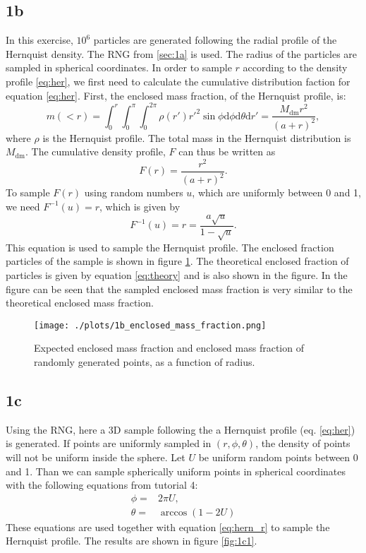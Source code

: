 \subsection*{1b}
In this exercise, $10^6$ particles are generated following the radial profile of the Hernquist density. The RNG from \ref{sec:1a} is used. The radius of the particles are sampled in spherical coordinates. In order to sample $r$ according to the density profile \ref{eq:her}, we first need to calculate the cumulative distribution faction for equation \ref{eq:her}. First, the enclosed mass fraction, of the Hernquist profile, is:
\begin{equation}
  m(<r) = \int_0^r \int_0^\pi \int_0^{2\pi} \rho(r') r'^2 \sin\phi \mathrm{d}\phi\mathrm{d}\theta\mathrm{d}r'=\frac{M_\mathrm{dm}r^2}{\left(a+r\right)^2},
\end{equation}
where $\rho$ is the Hernquist profile. The total mass in the Hernquist distribution is $M_\mathrm{dm}$. The cumulative density profile, $F$ can thus be written as
\begin{equation}\label{eq:theory}
  F(r) = \frac{r^2}{\left(a+r\right)^2}.
\end{equation}
To sample $F(r)$ using random numbers $u$, which are uniformly between 0 and 1, we need $F^{-1}(u) = r$, which is given by
\begin{equation}\label{eq:hern_r}
  F^{-1}(u) = r = \frac{a\sqrt{u}}{1-\sqrt{u}}.
\end{equation}
This equation is used to sample the Hernquist profile. The enclosed fraction particles of the sample is shown in figure \ref{fig:1b}. The theoretical enclosed fraction of particles is given by equation \ref{eq:theory} and is also shown in the figure. In the figure can be seen that the sampled enclosed mass fraction is very similar to the theoretical enclosed mass fraction.

\begin{figure}[!ht]
  \centering
  \texttt{[image: ./plots/1b\_enclosed\_mass\_fraction.png]}
  \caption{Expected enclosed mass fraction and enclosed mass fraction of randomly generated points, as a function of radius.}
  \label{fig:1b}
\end{figure}

\subsection*{1c}
Using the RNG, here a 3D sample following the a Hernquist profile (eq. \ref{eq:her}) is generated. If points are uniformly sampled in $(r,\phi, \theta)$, the density of points will not be uniform inside the sphere. Let $U$ be uniform random points between 0 and 1. Than we can sample spherically uniform points in spherical coordinates with the following equations from tutorial 4:
\begin{eqnarray}
  \phi =& 2\pi U, \\
  \theta =& \arccos(1-2U)
\end{eqnarray}
These equations are used together with equation \ref{eq:hern_r} to sample the Hernquist profile. The results are shown in figure \ref{fig:1c1}.


